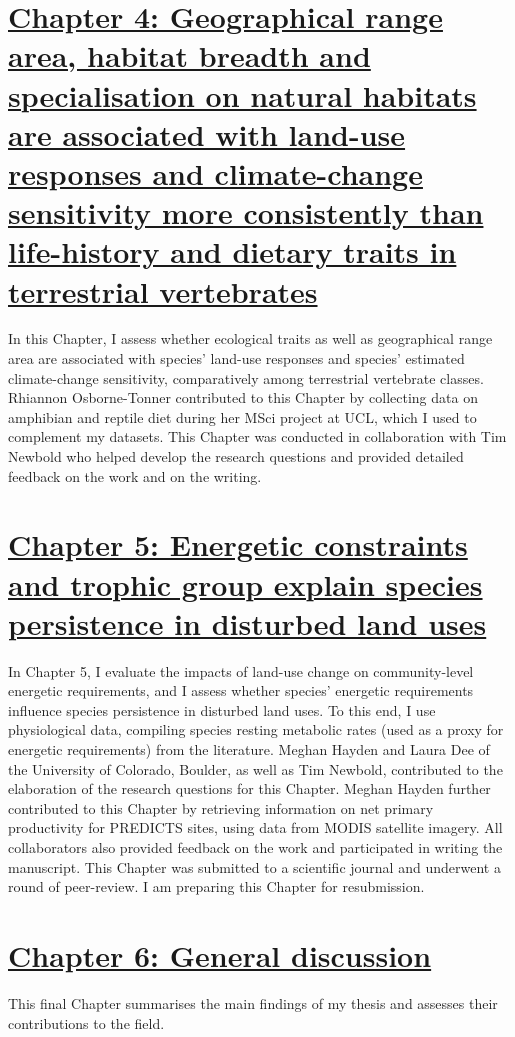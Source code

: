 \section*{\hyperref[sec:4]{Chapter 4: Geographical range area, habitat breadth and specialisation on natural habitats are associated with land-use responses and climate-change sensitivity more consistently than life-history and dietary traits in terrestrial vertebrates}}
In this Chapter, I assess whether ecological traits as well as geographical range area are associated with species' land-use responses and species' estimated climate-change sensitivity, comparatively among terrestrial vertebrate classes. Rhiannon Osborne-Tonner contributed to this Chapter by collecting data on amphibian and reptile diet during her MSci project at UCL, which I used to complement my datasets. This Chapter was conducted in collaboration with Tim Newbold who helped develop the research questions and provided detailed feedback on the work and on the writing.  %

\section*{\hyperref[sec:5]{Chapter 5: Energetic constraints and trophic group explain species persistence in disturbed land uses}}
In Chapter 5, I evaluate the impacts of land-use change on community-level energetic requirements, and I assess whether species' energetic requirements influence species persistence in disturbed land uses. To this end, I use physiological data, compiling species resting metabolic rates (used as a proxy for energetic requirements) from the literature. Meghan Hayden and Laura Dee of the University of Colorado, Boulder, as well as Tim Newbold, contributed to the elaboration of the research questions for this Chapter. Meghan Hayden further contributed to this Chapter by retrieving information on net primary productivity for PREDICTS sites, using data from MODIS satellite imagery. All collaborators also provided feedback on the work and participated in writing the manuscript. This Chapter was submitted to a scientific journal and underwent a round of peer-review. I am preparing this Chapter for resubmission.

\section*{\hyperref[sec:6]{Chapter 6: General discussion}}
This final Chapter summarises the main findings of my thesis and assesses their contributions to the field.